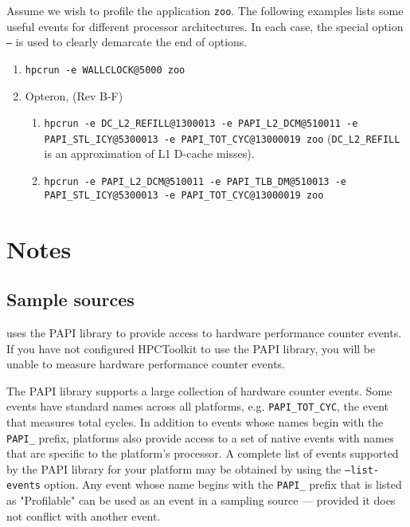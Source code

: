 \documentclass[english]{article}
\begin{document}
Assume we wish to profile the application \texttt{zoo}.
The following examples lists some useful events for different processor architectures.
In each case, the special option \texttt{--} is used to clearly demarcate the end of  options.

\begin{enumerate}
\item \verb+hpcrun -e WALLCLOCK@5000 zoo+

\item Opteron, (Rev B-F)
  \begin{enumerate}
    \item \verb+hpcrun -e DC_L2_REFILL@1300013 -e PAPI_L2_DCM@510011 -e PAPI_STL_ICY@5300013 -e PAPI_TOT_CYC@13000019 zoo+ (\verb+DC_L2_REFILL+ is an approximation of L1 D-cache misses).
    \item \verb+hpcrun -e PAPI_L2_DCM@510011 -e PAPI_TLB_DM@510013 -e PAPI_STL_ICY@5300013 -e PAPI_TOT_CYC@13000019 zoo+
  \end{enumerate}

\end{enumerate}

\section{Notes}

\subsection{Sample sources}

 uses the PAPI library to provide access to hardware performance counter events.
If you have not configured HPCToolkit to use the PAPI library, you will be unable to measure hardware performance counter events.

The PAPI library supports a large collection of hardware counter events.
Some events have standard names across all platforms, e.g. \verb+PAPI_TOT_CYC+, the event that measures total cycles.
In addition to events whose names begin with the \verb+PAPI_+ prefix, platforms also provide access to a set of native events with names that are specific to the platform's processor.
A complete list of events supported by the PAPI library for your platform may be obtained by using the \texttt{--list-events} option.
Any event whose name begins with the \verb+PAPI_+ prefix that is listed as "Profilable" can be used as an event in a sampling source --- provided it does not conflict with another event.
\end{document}
